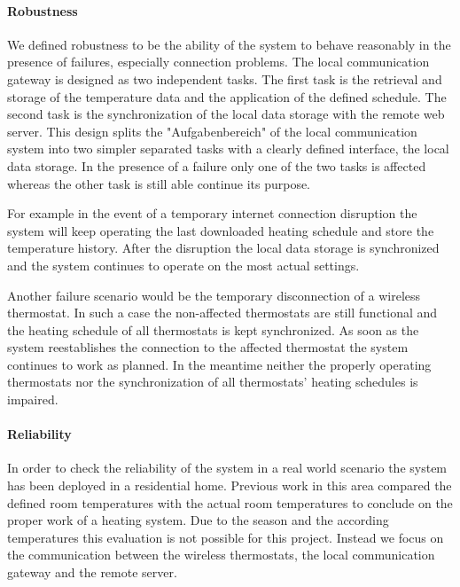 \paragraph{Robustness}

We defined robustness to be the ability of the system to behave reasonably in the presence of failures, especially connection problems.
The local communication gateway is designed as two independent tasks.
The first task is the retrieval and storage of the temperature data and the application of the defined schedule.
The second task is the synchronization of the local data storage with the remote web server.
This design splits the "Aufgabenbereich" of the local communication system into two simpler separated tasks with a clearly defined interface, the local data storage.
In the presence of a failure only one of the two tasks is affected whereas the other task is still able continue its purpose.

For example in the event of a temporary internet connection disruption the system will keep operating the last downloaded heating schedule and store the temperature history.
After the disruption the local data storage is synchronized and the system continues to operate on the most actual settings.

Another failure scenario would be the temporary disconnection of a wireless thermostat.
In such a case the non-affected thermostats are still functional and the heating schedule of all thermostats is kept synchronized.
As soon as the system reestablishes the connection to the affected thermostat the system continues to work as planned.
In the meantime neither the properly operating thermostats nor the synchronization of all thermostats' heating schedules is impaired.


\paragraph{Reliability}

In order to check the reliability of the system in a real world scenario the system has been deployed in a residential home.
Previous work in this area compared the defined room temperatures with the actual room temperatures to conclude on the proper work of a heating system\cite{eigenmann2012opportunisticSensing}.
Due to the season and the according temperatures this evaluation is not possible for this project.
Instead we focus on the communication between the wireless thermostats, the local communication gateway and the remote server.

